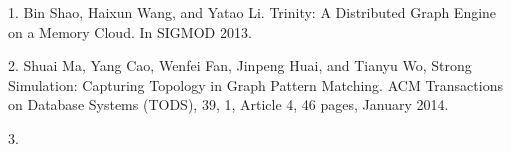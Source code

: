 1. Bin Shao, Haixun Wang, and Yatao Li. Trinity: A Distributed Graph Engine on a Memory Cloud. In SIGMOD 2013.

2. Shuai Ma, Yang Cao, Wenfei Fan, Jinpeng Huai, and Tianyu Wo, Strong Simulation: Capturing Topology in Graph Pattern Matching. 
ACM Transactions on Database Systems (TODS), 39, 1, Article 4, 46 pages, January 2014.

3. 

